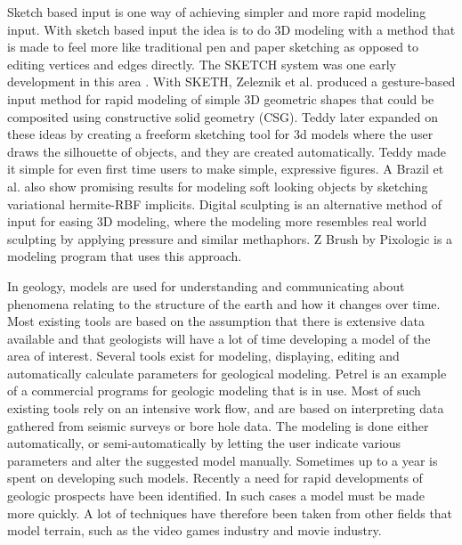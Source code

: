 \documentclass[a4paper,12pt]{report}
\begin{document}
 Sketch based input is one way of achieving simpler and more rapid modeling input. With sketch based input the idea is to do 3D modeling with a method that is made to feel more like traditional pen and paper sketching as opposed to editing vertices and edges directly.
The SKETCH system was one early development in this area \cite{zeleznik2007sketch}. With SKETH, Zeleznik et al. produced a gesture-based input method for rapid modeling of simple 3D geometric shapes that could be composited using constructive solid geometry (CSG). Teddy \cite{Igarashi:1999:TSI:311535.311602} later expanded on these ideas by creating a freeform sketching tool for 3d models where the user draws the silhouette of objects, and they are created automatically. Teddy made it simple for even first time users to make simple, expressive figures. A Brazil et al. \cite{brazil2010sketching} also show promising results for modeling soft looking objects by sketching variational hermite-RBF implicits.
Digital sculpting is an alternative method of input for easing 3D modeling, where the modeling more resembles real world sculpting by applying pressure and similar methaphors. Z Brush by Pixologic is a modeling program that uses this approach.
 

In geology, models are used for understanding and communicating about phenomena relating to the structure of the earth and how it changes over time. Most existing tools are based on the assumption that there is extensive data available and that geologists will have a lot of time developing a model of the area of interest. Several tools exist for modeling, displaying, editing and automatically calculate parameters for geological modeling.  Petrel \cite{petrel} is an example of a commercial programs for geologic modeling that is in use. Most of such existing tools rely on an intensive work flow, and are based on interpreting data gathered from seismic surveys or bore hole data. The modeling is done either automatically, or semi-automatically by letting the user indicate various parameters and alter the suggested model manually. Sometimes up to a year is spent on developing such models. Recently a need for rapid developments of geologic prospects have been identified. In such cases a model must be made more quickly. A lot of techniques have therefore been taken from other fields that model terrain, such as the video games industry and movie industry.
\end{document}
